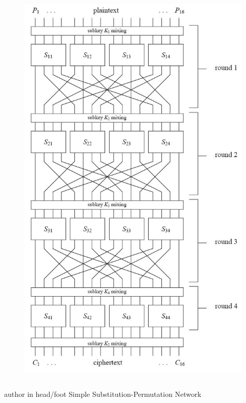 \documentclass[9pt]{beamer}
\begin{document}
\begin{frame}
\begin{columns}
\begin{column}{0.4\textwidth}
\begin{figure}
\includegraphics[totalheight=0.9\textheight]{spn.jpg}
\end{figure}
\end{column}
\end{columns}
\end{frame}

\begin{frame}
\begin{beamercolorbox}[ht=2.5ex,dp=1.125ex,center,rounded=true,shadow=true]{author in head/foot}
Simple Substitution-Permutation Network
\end{beamercolorbox}
\end{frame}
\end{document}
